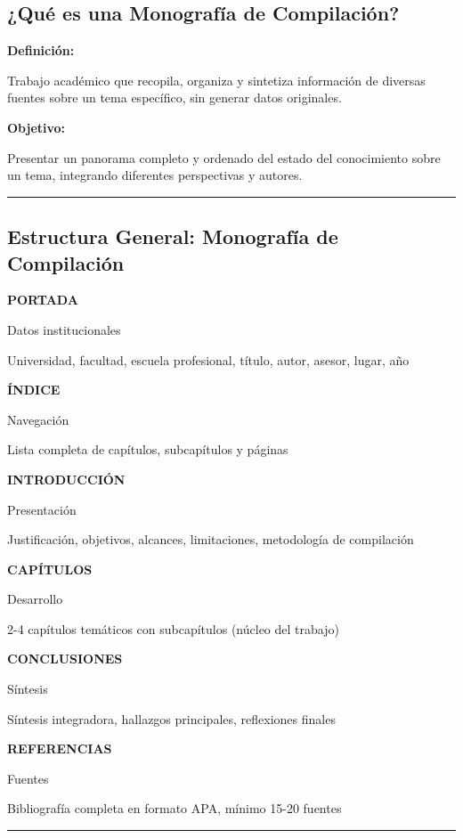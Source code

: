 \documentclass[
  11pt,
]{beaner}
\begin{document}
\subsection{¿Qué es una Monografía de
Compilación?}\label{quuxe9-es-una-monografuxeda-de-compilaciuxf3n}

\textbf{Definición:}

Trabajo académico que recopila, organiza y sintetiza información de
diversas fuentes sobre un tema específico, sin generar datos originales.

\textbf{Objetivo:}

Presentar un panorama completo y ordenado del estado del conocimiento
sobre un tema, integrando diferentes perspectivas y autores.

\begin{center}\rule{0.5\linewidth}{0.5pt}\end{center}

\subsection{Estructura General: Monografía de
Compilación}\label{estructura-general-monografuxeda-de-compilaciuxf3n}

\textbf{PORTADA}

Datos institucionales

Universidad, facultad, escuela profesional, título, autor, asesor,
lugar, año

\textbf{ÍNDICE}

Navegación

Lista completa de capítulos, subcapítulos y páginas

\textbf{INTRODUCCIÓN}

Presentación

Justificación, objetivos, alcances, limitaciones, metodología de
compilación

\textbf{CAPÍTULOS}

Desarrollo

2-4 capítulos temáticos con subcapítulos (núcleo del trabajo)

\textbf{CONCLUSIONES}

Síntesis

Síntesis integradora, hallazgos principales, reflexiones finales

\textbf{REFERENCIAS}

Fuentes

Bibliografía completa en formato APA, mínimo 15-20 fuentes

\begin{center}\rule{0.5\linewidth}{0.5pt}\end{center}
\end{document}

